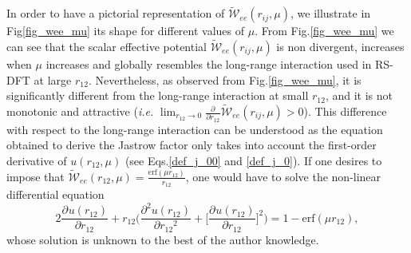 \documentclass[aip,jcp,reprint,noshowkeys,superscriptaddress]{revtex4-1}
\newcommand{\deriv}[3]{\frac{\partial^{#3} #1}{\partial {#2}^{#3}}}
\begin{document}
In order to have a pictorial representation of $ \tilde{\mathcal{W}}_{ee}(r_{ij},\mu)$, we illustrate in Fig\ref{fig_wee_mu} its shape for different values of $\mu$. 
From  Fig.\ref{fig_wee_mu} we can see that the scalar effective potential $ \tilde{\mathcal{W}}_{ee}(r_{ij},\mu)$ 
is non divergent, increases when $\mu$ increases and globally resembles the long-range interaction used in RS-DFT at large $r_{12}$. 
Nevertheless, as observed from Fig.\ref{fig_wee_mu}, it is significantly different 
from the long-range interaction at small $r_{12}$, 
and it is not monotonic and attractive (\textit{i.e.} $\lim_{r_{12} \rightarrow 0} \deriv{}{r_{12}}{} \tilde{\mathcal{W}}_{ee}(r_{ij},\mu) >0 $). 
This difference with respect to the long-range interaction can be understood as the equation obtained to derive the Jastrow factor only takes into account the first-order derivative of $u(r_{12},\mu)$ (see Eqs.\eqref{def_j_00} and \eqref{def_j_0}). 
If one desires to impose that $\tilde{\mathcal{W}}_{ee}(r_{12},\mu) = \frac{\text{erf}(\mu r_{12})}{r_{12}}$, one would have to solve the non-linear differential equation 
\begin{equation}
 2 \deriv{u(r_{12})}{r_{12}}{} + r_{12} \bigg( \deriv{u(r_{12})}{r_{12}}{2} + \bigg[ \deriv{u(r_{12})}{r_{12}}{} \bigg]^2\bigg) = 1 - \text{erf}(\mu r_{12}), 
\end{equation}
whose solution is unknown to the best of the author knowledge. 
\end{document}
